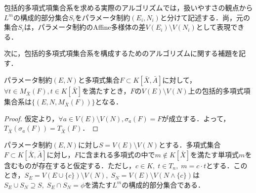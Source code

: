 \begin{remark*}
	包括的多項式項集合系を求める実際のアルゴリズムでは，扱いやすさの観点から$L^m$の構成的部分集合$S_i$をパラメータ制約$(E_i, N_i)$と分けて記述する．尚，元の集合$S_i$は，パラメータ制約のAffine多様体の差$V(E_i) \setminus V(N_i)$として表現できる．
\end{remark*}

次に，包括的多項式項集合系を構成するためのアルゴリズムに関する補題を記す．

\begin{lemma}
	\label{chapter04:lemma:for_alg_1}
	パラメータ制約$(E, N)$と多項式集合$F \subset K[\bar{X}, \bar{A}]$に対して，$\forall t \in M_{\bar{X}}(F), t \in K[\bar{X}]$を満たすとき，$F$の$V(E) \setminus V(N)$上の包括的多項式項集合系は$\{(E, N, M_{\bar{X}}(F))\}$となる．
\end{lemma}

\begin{proof}
	仮定より，$\forall a \in V(E) \setminus V(N), \sigma_a(F) = F$が成立する．よって，$T_{\bar{X}}(\sigma_a(F)) = T_{\bar{X}}(F)$．
\end{proof}

\begin{lemma}
	\label{chapter04:lemma:for_alg_2}
	パラメータ制約$(E, N)$に対し$S = V(E) \setminus V(N)$とする．多項式集合$F \subset K[\bar{X}, \bar{A}]$に対し，$F$に含まれる多項式の中で$m \notin K[\bar{X}]$を満たす単項式$m$を含むものが存在すると仮定する．ただし，$c \in K,\; t \in T_n, \; m = c \cdot t$とする．このとき，$S_E = V(E \cup \{ c \}) \setminus V(N), \; S_N = V(E) \setminus V(N \land \{ c \})$は$S_E \cup S_N \supseteq S,\; S_E \cap S_N = \phi$を満たす$L^m$の構成的部分集合である．
\end{lemma}


